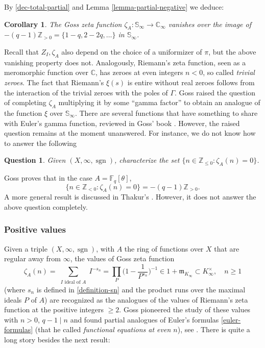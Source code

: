 \documentclass[11pt]{amsart}
\numberwithin{equation}{section}
\newcommand{\ZZ}{\mathbb{Z}}
\newcommand{\FF}{\mathbb{F}}
\newcommand{\CC}{\mathbb{C}}
\newcommand{\sgn}{\operatorname{sgn}}
\newtheorem{Question}[Theorem]{Question}
\newtheorem{Corollary}[Theorem]{Corollary}
\begin{document}
By \eqref{dec-total-partial} and Lemma \ref{lemma-partial-negative} we deduce:

\begin{Corollary}\label{corollary-trivial zeroes}
The Goss zeta function $\zeta_A:\mathbb{S}_\infty\rightarrow\CC_\infty$ vanishes over the image of $-(q-1)\ZZ_{>0}=\{1-q,2-2q,\ldots\}$ in $\mathbb{S}_\infty$. 
\end{Corollary}

Recall that $Z_I,\zeta_A$ also depend on the choice of a uniformizer of $\pi$, but the above vanishing property does not.
Analogously, Riemann's zeta function, seen as a meromorphic function over $\CC$, has zeroes at even integers $n<0$, so called 
{\em trivial zeroes}. The fact that Riemann's $\xi(s)$ is entire without real zeroes follows from the interaction of 
the trivial zeroes with the poles of $\Gamma$. Goss raised the question of completing $\zeta_A$ multiplying it by some ``gamma factor'' 
to obtain 
an analogue of the function $\xi$ over $\mathbb{S}_\infty$. There are several functions that 
have something to share with Euler's gamma function, reviewed in Goss' book \cite{GOS}. However, the raised question remains at the moment unanswered. For instance, we do not know how to answer the following

\begin{Question}
Given $(X,\infty,\sgn)$, characterize the set $\{n\in\ZZ_{\leq0}:\zeta_A(n)=0\}$.
\end{Question}

Goss proves \cite{GOS0} that in the case $A=\FF_q[\theta]$,  
$$\{n\in\ZZ_{<0}:\zeta_A(n)=0\}=-(q-1)\ZZ_{>0}.$$ A more general result is discussed in Thakur's \cite[Theorem 5.3.2]{THA0}.
However, it does not answer the above question completely.

\subsubsection{Positive values}\label{positive-values} Given a triple $(X,\infty,\sgn)$, with $A$ the ring of functions over $X$ that are regular away from $\infty$, the values of Goss zeta function
\begin{equation}\label{definition-goss-zeta-values}
\zeta_A(n)=\sum_{\begin{smallmatrix} I \text{ ideal of }A\end{smallmatrix}}I^{-s_n}=\prod_{P}\Big(1-\frac{1}{P^{s_n}}\Big)^{-1}\in 1+\mathfrak{m}_{K_\infty}\subset K_\infty^\times,\quad n\geq 1
\end{equation}
(where $s_n$ is defined in \eqref{definition-sn} and the product runs over the maximal ideals $P$ of $A$) are recognized as the analogues of the values of Riemann's zeta function at the positive integers $\geq 2$.
Goss pioneered the study of these values with $n>0$, $q-1\mid n$ and found partial analogues of Euler's formulas \eqref{euler-formulas} (that he called {\em functional equations at even $n$}), see \cite[Theorem 8.19.4]{GOS}. There is quite a long story besides the next result:
\end{document}

